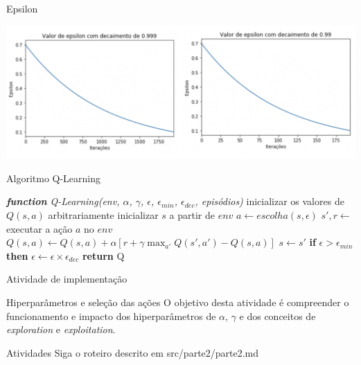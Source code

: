 \documentclass{beamer}
\begin{document}
\begin{frame}{Epsilon}
	  \begin{center}
		\includegraphics[width=\textwidth]{figuras/epsilon.png}
	\end{center}
\end{frame}

\begin{frame}{Algoritmo Q-Learning}
	
\begin{algorithmic} 
	\STATE \emph{\textbf{function} Q-Learning(env, $\alpha$, $\gamma$, $\epsilon$, $\epsilon_{min}$, $\epsilon_{dec}$, episódios)}
	\STATE inicializar os valores de $Q(s, a)$ arbitrariamente
	\STATE inicializar $s$ a partir de $env$
	\REPEAT
	\STATE $a \leftarrow escolha(s, \epsilon)$
	\STATE $s', r \leftarrow$ executar a ação $a$ no $env$
	\STATE $Q(s,a) \leftarrow Q(s,a) + \alpha [r +\gamma \max_{a'}{Q(s', a')} - Q(s,a)]$
	\STATE$s  \leftarrow s'$
	\STATE \textbf{if} $\epsilon > \epsilon_{min}$ \textbf{then} $\epsilon \leftarrow \epsilon \times \epsilon_{dec}$
	\ENDFOR
	\STATE \textbf{return} Q
\end{algorithmic}	
\end{frame}

\begin{frame}{Atividade de implementação}
		
	\begin{alertblock}{Hiperparâmetros e seleção das ações}
		O objetivo desta atividade é compreender o funcionamento e impacto dos hiperparâmetros de $\alpha$, $\gamma$ e dos conceitos de \textit{exploration} e \textit{exploitation}.
	\end{alertblock}
	
	\begin{block}{Atividades}
		Siga o roteiro descrito em src/parte2/parte2.md \href{https://github.com/fbarth/reinLearn/blob/main/src/parte2/parte2.md}
		{}
	\end{block}

\end{frame}
\end{document}
